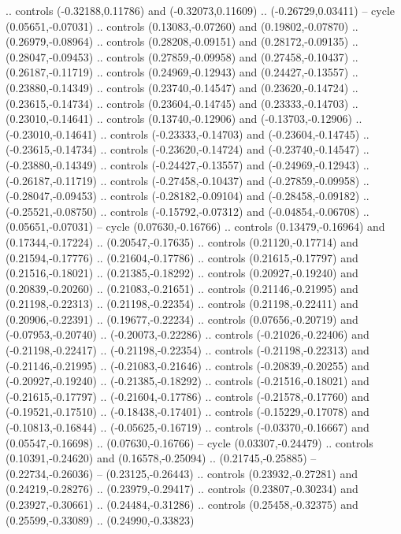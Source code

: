 {{.. controls (-0.32188,0.11786) and (-0.32073,0.11609) .. (-0.26729,0.03411)
-- cycle
(0.05651,-0.07031)
.. controls (0.13083,-0.07260) and (0.19802,-0.07870) .. (0.26979,-0.08964)
.. controls (0.28208,-0.09151) and (0.28172,-0.09135) .. (0.28047,-0.09453)
.. controls (0.27859,-0.09958) and (0.27458,-0.10437) .. (0.26187,-0.11719)
.. controls (0.24969,-0.12943) and (0.24427,-0.13557) .. (0.23880,-0.14349)
.. controls (0.23740,-0.14547) and (0.23620,-0.14724) .. (0.23615,-0.14734)
.. controls (0.23604,-0.14745) and (0.23333,-0.14703) .. (0.23010,-0.14641)
.. controls (0.13740,-0.12906) and (-0.13703,-0.12906) .. (-0.23010,-0.14641)
.. controls (-0.23333,-0.14703) and (-0.23604,-0.14745) .. (-0.23615,-0.14734)
.. controls (-0.23620,-0.14724) and (-0.23740,-0.14547) .. (-0.23880,-0.14349)
.. controls (-0.24427,-0.13557) and (-0.24969,-0.12943) .. (-0.26187,-0.11719)
.. controls (-0.27458,-0.10437) and (-0.27859,-0.09958) .. (-0.28047,-0.09453)
.. controls (-0.28182,-0.09104) and (-0.28458,-0.09182) .. (-0.25521,-0.08750)
.. controls (-0.15792,-0.07312) and (-0.04854,-0.06708) .. (0.05651,-0.07031)
-- cycle
(0.07630,-0.16766)
.. controls (0.13479,-0.16964) and (0.17344,-0.17224) .. (0.20547,-0.17635)
.. controls (0.21120,-0.17714) and (0.21594,-0.17776) .. (0.21604,-0.17786)
.. controls (0.21615,-0.17797) and (0.21516,-0.18021) .. (0.21385,-0.18292)
.. controls (0.20927,-0.19240) and (0.20839,-0.20260) .. (0.21083,-0.21651)
.. controls (0.21146,-0.21995) and (0.21198,-0.22313) .. (0.21198,-0.22354)
.. controls (0.21198,-0.22411) and (0.20906,-0.22391) .. (0.19677,-0.22234)
.. controls (0.07656,-0.20719) and (-0.07953,-0.20740) .. (-0.20073,-0.22286)
.. controls (-0.21026,-0.22406) and (-0.21198,-0.22417) .. (-0.21198,-0.22354)
.. controls (-0.21198,-0.22313) and (-0.21146,-0.21995) .. (-0.21083,-0.21646)
.. controls (-0.20839,-0.20255) and (-0.20927,-0.19240) .. (-0.21385,-0.18292)
.. controls (-0.21516,-0.18021) and (-0.21615,-0.17797) .. (-0.21604,-0.17786)
.. controls (-0.21578,-0.17760) and (-0.19521,-0.17510) .. (-0.18438,-0.17401)
.. controls (-0.15229,-0.17078) and (-0.10813,-0.16844) .. (-0.05625,-0.16719)
.. controls (-0.03370,-0.16667) and (0.05547,-0.16698) .. (0.07630,-0.16766)
-- cycle
(0.03307,-0.24479)
.. controls (0.10391,-0.24620) and (0.16578,-0.25094) .. (0.21745,-0.25885)
-- (0.22734,-0.26036)
-- (0.23125,-0.26443)
.. controls (0.23932,-0.27281) and (0.24219,-0.28276) .. (0.23979,-0.29417)
.. controls (0.23807,-0.30234) and (0.23927,-0.30661) .. (0.24484,-0.31286)
.. controls (0.25458,-0.32375) and (0.25599,-0.33089) .. (0.24990,-0.33823)
}}
